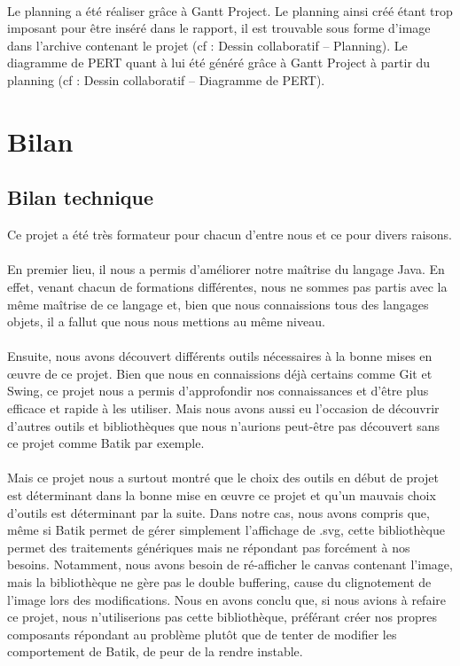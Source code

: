 \documentclass[a4paper,11pt]{article}
\begin{document}
\paragraph{} Le planning a été réaliser grâce à Gantt Project. Le planning ainsi créé étant trop imposant pour être inséré dans le rapport, il est trouvable sous forme d'image dans l'archive contenant le projet (cf : Dessin collaboratif – Planning). Le diagramme de PERT quant à lui été généré grâce à Gantt Project à partir du planning (cf : Dessin collaboratif – Diagramme de PERT).

\section{Bilan}
\subsection{Bilan technique}
Ce projet a été très formateur pour chacun d'entre nous et ce pour divers raisons. 

\paragraph{} En premier lieu, il nous a permis d'améliorer notre maîtrise du langage Java. En effet, venant chacun de formations différentes, nous ne sommes pas partis avec la même maîtrise de ce langage et, bien que nous connaissions tous des langages objets, il a fallut que nous nous mettions au même niveau.

\paragraph{} Ensuite, nous avons découvert différents outils nécessaires à la bonne mises en œuvre de ce projet. Bien que nous en connaissions déjà certains comme Git et Swing, ce projet nous a permis d'approfondir nos connaissances et d'être plus efficace et rapide à les utiliser. Mais nous avons aussi eu l'occasion de découvrir d'autres outils et bibliothèques que nous n'aurions peut-être pas découvert sans ce projet comme Batik par exemple.

\paragraph{} Mais ce projet nous a surtout montré que le choix des outils en début de projet est déterminant dans la bonne mise en œuvre ce projet et qu'un mauvais choix d'outils est déterminant par la suite. Dans notre cas, nous avons compris que, même si Batik permet de gérer simplement l'affichage de .svg, cette bibliothèque permet des traitements génériques mais ne répondant pas forcément à nos besoins. Notamment, nous avons besoin de ré-afficher le canvas contenant l'image, mais la bibliothèque ne gère pas le double buffering, cause du clignotement de l'image lors des modifications. Nous en avons conclu que, si nous avions à refaire ce projet, nous n'utiliserions pas cette bibliothèque, préférant créer nos propres composants répondant au problème plutôt que de tenter de modifier les comportement de Batik, de peur de la rendre instable.
\end{document}
